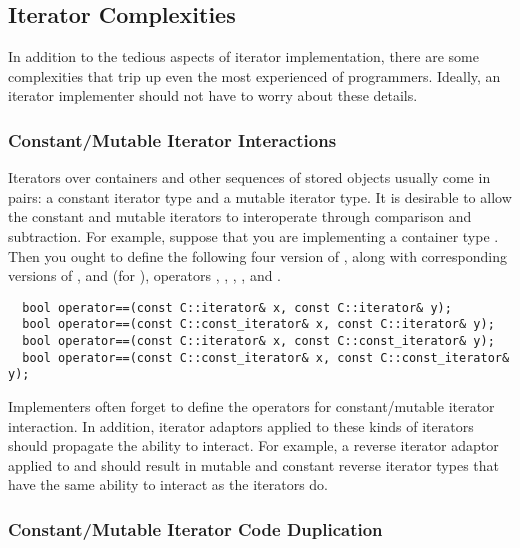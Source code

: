 \documentclass{netobjectdays}
\begin{document}
\subsection{Iterator Complexities}

In addition to the tedious aspects of iterator implementation, there
are some complexities that trip up even the most experienced of
programmers. Ideally, an iterator implementer should not have to worry
about these details.

\subsubsection{Constant/Mutable Iterator Interactions}
\label{sec:constant-mutable-iterations}

Iterators over containers and other sequences of stored objects
usually come in pairs: a constant iterator type and a mutable iterator
type. It is desirable to allow the constant and mutable iterators to
interoperate through comparison and
subtraction. For example, suppose
that you are implementing a container type . Then you ought to
define the following four version of , along with
corresponding versions of , and (for
), operators \code{<}, \code{>},
\code{<=}, \code{>=}, and \code{-}.


{\footnotesize
\begin{verbatim}
  bool operator==(const C::iterator& x, const C::iterator& y);
  bool operator==(const C::const_iterator& x, const C::iterator& y);
  bool operator==(const C::iterator& x, const C::const_iterator& y);
  bool operator==(const C::const_iterator& x, const C::const_iterator& y);
\end{verbatim}
}

Implementers often forget to define the operators for constant/mutable
iterator interaction. In addition, iterator adaptors applied to these
kinds of iterators should propagate the ability to interact. For
example, a reverse iterator adaptor applied to  and
 should result in mutable and constant reverse iterator types that
have the same ability to interact as the  iterators do.

\subsubsection{Constant/Mutable Iterator Code Duplication}

\end{document}
